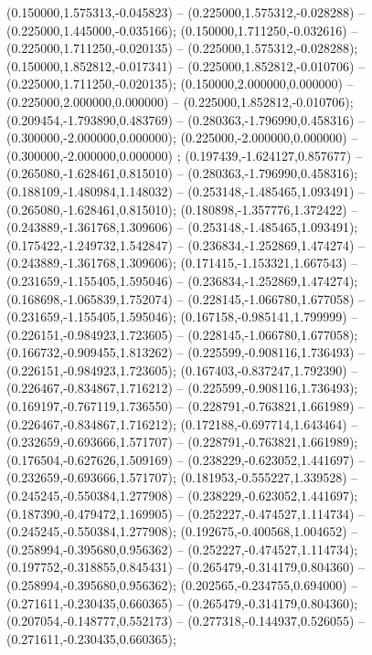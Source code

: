  (0.150000,1.575313,-0.045823) -- (0.225000,1.575312,-0.028288) -- (0.225000,1.445000,-0.035166);
 (0.150000,1.711250,-0.032616) -- (0.225000,1.711250,-0.020135) -- (0.225000,1.575312,-0.028288);
 (0.150000,1.852812,-0.017341) -- (0.225000,1.852812,-0.010706) -- (0.225000,1.711250,-0.020135);
 (0.150000,2.000000,0.000000) -- (0.225000,2.000000,0.000000) -- (0.225000,1.852812,-0.010706);
 (0.209454,-1.793890,0.483769) -- (0.280363,-1.796990,0.458316) -- (0.300000,-2.000000,0.000000);
 (0.225000,-2.000000,0.000000) -- (0.300000,-2.000000,0.000000) ;
 (0.197439,-1.624127,0.857677) -- (0.265080,-1.628461,0.815010) -- (0.280363,-1.796990,0.458316);
 (0.188109,-1.480984,1.148032) -- (0.253148,-1.485465,1.093491) -- (0.265080,-1.628461,0.815010);
 (0.180898,-1.357776,1.372422) -- (0.243889,-1.361768,1.309606) -- (0.253148,-1.485465,1.093491);
 (0.175422,-1.249732,1.542847) -- (0.236834,-1.252869,1.474274) -- (0.243889,-1.361768,1.309606);
 (0.171415,-1.153321,1.667543) -- (0.231659,-1.155405,1.595046) -- (0.236834,-1.252869,1.474274);
 (0.168698,-1.065839,1.752074) -- (0.228145,-1.066780,1.677058) -- (0.231659,-1.155405,1.595046);
 (0.167158,-0.985141,1.799999) -- (0.226151,-0.984923,1.723605) -- (0.228145,-1.066780,1.677058);
 (0.166732,-0.909455,1.813262) -- (0.225599,-0.908116,1.736493) -- (0.226151,-0.984923,1.723605);
 (0.167403,-0.837247,1.792390) -- (0.226467,-0.834867,1.716212) -- (0.225599,-0.908116,1.736493);
 (0.169197,-0.767119,1.736550) -- (0.228791,-0.763821,1.661989) -- (0.226467,-0.834867,1.716212);
 (0.172188,-0.697714,1.643464) -- (0.232659,-0.693666,1.571707) -- (0.228791,-0.763821,1.661989);
 (0.176504,-0.627626,1.509169) -- (0.238229,-0.623052,1.441697) -- (0.232659,-0.693666,1.571707);
 (0.181953,-0.555227,1.339528) -- (0.245245,-0.550384,1.277908) -- (0.238229,-0.623052,1.441697);
 (0.187390,-0.479472,1.169905) -- (0.252227,-0.474527,1.114734) -- (0.245245,-0.550384,1.277908);
 (0.192675,-0.400568,1.004652) -- (0.258994,-0.395680,0.956362) -- (0.252227,-0.474527,1.114734);
 (0.197752,-0.318855,0.845431) -- (0.265479,-0.314179,0.804360) -- (0.258994,-0.395680,0.956362);
 (0.202565,-0.234755,0.694000) -- (0.271611,-0.230435,0.660365) -- (0.265479,-0.314179,0.804360);
 (0.207054,-0.148777,0.552173) -- (0.277318,-0.144937,0.526055) -- (0.271611,-0.230435,0.660365);
